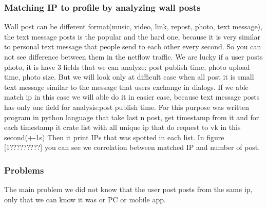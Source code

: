 \subsubsection{Matching IP to profile by analyzing wall posts}
Wall post can be different format(music, video, link, repost, photo, text message), the text message posts is the popular and the hard one, because it is very similar to personal text message that people send to each other every second. So you can not see difference between them in the netflow traffic. We are lucky if a user posts photo, it is have 3 fields that we can analyze: post publish time, photo upload time, photo size. But we will look only at difficult case when all post it is small text message similar to the message that users exchange in dialogs. If we able match ip in this case we will able do it in easier case, because text message posts has only one field for analysis:post publish time. For this purpose was written program in python language that take last n post, get timestamp from it and for each timestamp it crate list with all unique ip that do request to vk in this second(+-1s) Then it print IPs that was spotted in each list. In figure [1?????????] you can see we correlation between matched IP and number of post. 
 
\begin{figure}[H]%
\end{figure}

\subsubsection{Problems}
The main problem we did not know that the user post posts from the same ip, only that we can know it was or PC or mobile app. 


